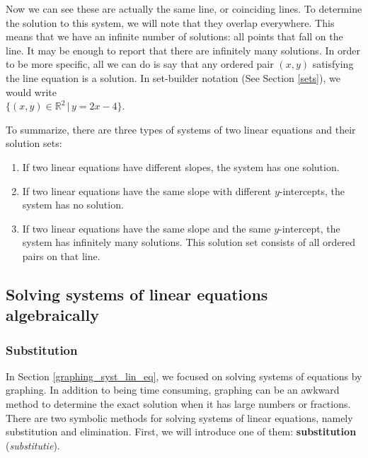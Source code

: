Now we can see these are actually the same line, or coinciding lines. To determine the solution to this system, we will note that they overlap everywhere. This means that we have an infinite number of solutions: all points that fall on the
line. It may be enough to report that there are infinitely many solutions. In order to be more specific, all we can do is say that any ordered pair $(x,y)$ satisfying the line equation is a solution. In set-builder notation (See Section \ref{sets}), we would write \\
$\{(x,y) \in \mathbb{R}^2 \, | \, y=2x-4  \}$.
	


To summarize, there are three types of systems of two linear equations and their solution sets:
\begin{enumerate}
	\item If two linear equations have different slopes, the system has one solution.
	\item If two linear equations have the same slope with different $y$-intercepts, the system has no solution.
	\item If two linear equations have the same slope and the same $y$-intercept, the system has infinitely many solutions.
	This solution set consists of all ordered pairs on that line.
\end{enumerate}




\subsection{Solving systems of linear equations algebraically}  

\subsubsection{Substitution}  \label{syst_lin_eq_substitution}
In Section \ref{graphing_syst_lin_eq}, we focused on solving systems of equations by graphing. In addition to being time consuming, graphing can be an awkward method to determine the exact solution when it has large numbers or fractions. There are two symbolic methods for solving systems of linear equations, namely substitution and elimination. First, we will introduce one of them: \textbf{substitution} (\textit{substitutie}).



